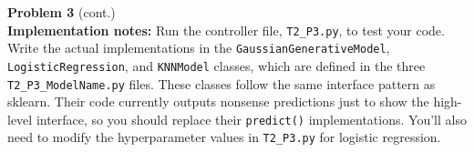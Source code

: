 \documentclass[submit]{harvardml}
\begin{document}
\newpage

\begin{framed}
\noindent\textbf{Problem 3} (cont.)\\


\textbf{Implementation notes:} Run the controller file, \texttt{T2\_P3.py},
to test your code. Write the actual implementations in the \texttt{GaussianGenerativeModel},
\texttt{LogisticRegression}, and \texttt{KNNModel} classes, which are defined in the three
\texttt{T2\_P3\_ModelName.py} files. These classes follow the same interface pattern
as sklearn. Their code
currently outputs nonsense predictions just to show the
high-level interface, so you should replace their \texttt{predict()} implementations.
You'll also need to modify the hyperparameter
values in \texttt{T2\_P3.py} for logistic regression.
\end{framed}
\end{document}
